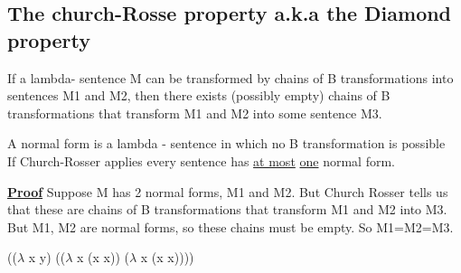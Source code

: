 \documentclass{article}
\begin{document}
\begin{flushleft}
\subsection*{The church-Rosse property a.k.a the Diamond property}
\begin{flushleft}
If a lambda- sentence M can be transformed by chains of B transformations into sentences M1 and M2, then there exists (possibly empty) chains of B transformations that transform M1 and M2 into some sentence M3.
\end{flushleft}
\begin{flushleft}
A normal form is a lambda - sentence in which no B transformation is possible \\
If Church-Rosser applies every sentence has \underline{at most} \underline{one} normal form.
\end{flushleft}
\begin{flushleft}
\textbf{\underline{Proof}} Suppose M has 2 normal forms, M1 and M2. But Church Rosser tells us that these are chains of B      transformations that transform M1 and M2 into M3. But M1, M2 are normal forms, so these chains must be empty. So M1=M2=M3.
\end{flushleft}
\begin{flushleft}
(($\lambda$ x y) (($\lambda$ x (x x)) ($\lambda$ x (x x))))
\end{flushleft}
\end{flushleft}
\end{document}

